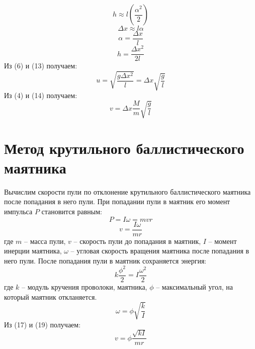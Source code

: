 \documentclass{article}
\begin{document}
    \begin{equation}
        h \approx l\left(\frac{\alpha^2}{2}\right)
    \end{equation}
    \begin{equation}
        \Delta x \approx l\alpha
    \end{equation}
    \begin{equation}
        \alpha = \frac{\Delta x}{l}
    \end{equation}
    \begin{equation}
        h = \frac{\Delta x^2}{2l}
    \end{equation}
    Из (6) и (13) получаем:
    \begin{equation}
        u = \sqrt{\frac{g \Delta x^2}{l}} = \Delta x \sqrt{\frac{g}{l}}
    \end{equation}
    Из (4) и (14) получаем:
    \begin{equation}
        v = \Delta x \frac{M}{m} \sqrt{\frac{g}{l}}
    \end{equation}

    \section{Метод крутильного баллистического маятника}

    Вычислим скорости пули по отклонение крутильного баллистического маятника после попадания в него пули.
    \newline
    При попадании пули в маятник его момент импульса $P$ становится равным:
    \begin{equation}
        P = I \omega = mvr
    \end{equation}
    \begin{equation}
        v = \frac{I \omega}{mr}
    \end{equation}
    где $m$ -- масса пули, $v$ -- скорость пули до попадания в маятник, $I$ -- момент инерции маятника,
    $\omega$ -- угловая скорость вращения маятника после попадания в него пули.
    \newline
    После попадания пули в маятник сохраняется энергия:
    \begin{equation}
        k \frac{\phi^2}{2} = I \frac{\omega^2}{2}
    \end{equation}
    где $k$ -- модуль кручения проволоки, маятника, $\phi$ -- максимальный угол, на который маятник откланяется.
    \begin{equation}
        \omega = \phi \sqrt{\frac{k}{I}}
    \end{equation}
    Из (17) и (19) получаем:
    \begin{equation}
        v = \phi \frac{\sqrt{kI}}{mr}
    \end{equation}
\end{document}
